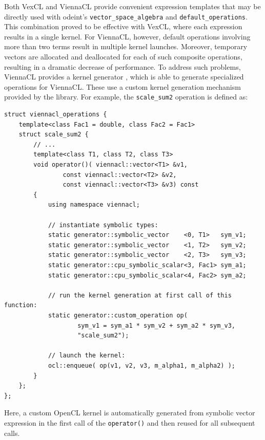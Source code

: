 \documentclass[final]{siamltex}
\newcommand{\code}[1]{\lstinline|#1|}
\begin{document}
Both VexCL and ViennaCL provide convenient expression templates that
may be directly used with odeint's \code{vector_space_algebra} and
\code{default_operations}. This combination proved to be
effective with VexCL, where each expression results in a single
kernel. For ViennaCL, however, default operations involving more than two
terms result in multiple kernel launches.  Moreover, temporary vectors
are allocated and deallocated for each of such composite operations, resulting in a dramatic decrease of performance.
To address such problems, ViennaCL provides a kernel generator \cite{tillet:kernel-generator}, which is able to generate
specialized operations for ViennaCL. These use a custom kernel
generation mechanism provided by the library.  For example,
the \code{scale_sum2} operation is defined as:
\begin{lstlisting}
struct viennacl_operations {
    template<class Fac1 = double, class Fac2 = Fac1>
    struct scale_sum2 {
        // ...
        template<class T1, class T2, class T3>
        void operator()( viennacl::vector<T1> &v1,
                const viennacl::vector<T2> &v2,
                const viennacl::vector<T3> &v3) const
        {
            using namespace viennacl;

            // instantiate symbolic types:
            static generator::symbolic_vector    <0, T1>   sym_v1;
            static generator::symbolic_vector    <1, T2>   sym_v2;
            static generator::symbolic_vector    <2, T3>   sym_v3;
            static generator::cpu_symbolic_scalar<3, Fac1> sym_a1;
            static generator::cpu_symbolic_scalar<4, Fac2> sym_a2;

            // run the kernel generation at first call of this function:
            static generator::custom_operation op(
                    sym_v1 = sym_a1 * sym_v2 + sym_a2 * sym_v3,
                    "scale_sum2");

            // launch the kernel:
            ocl::enqueue( op(v1, v2, v3, m_alpha1, m_alpha2) );
        }
    };
};
\end{lstlisting} %
Here, a custom OpenCL kernel is automatically generated from symbolic vector expression
in the first call of the \code{operator()} and then reused for all subsequent calls.
\end{document}
